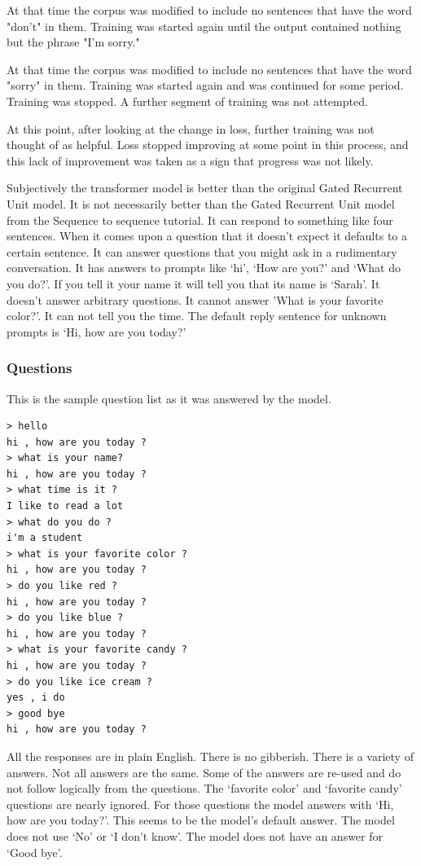 At that time the corpus was modified to include no 
sentences that have the word "don't" in them. Training was started again until the output contained nothing but the phrase "I'm sorry." 

At that time the corpus was modified to include no sentences that have the word "sorry" in them. Training was started again and was continued for some period. Training was stopped. A further segment of training was not attempted. 

At this point, after looking at the change in loss, further training was not thought of as helpful. Loss stopped improving at some point in this process, and this lack of improvement was taken as a sign that progress was not likely.

Subjectively the transformer model is better than the original Gated Recurrent Unit model. It is not necessarily better than the Gated Recurrent Unit model from the Sequence to sequence tutorial. It can respond to something like four sentences. When it comes upon a question that it doesn't expect it defaults to a certain sentence. It can answer questions that you might ask in a rudimentary conversation. It has answers to prompts like `hi', `How are you?' and `What do you do?'. If you tell it your name it will tell you that its name is `Sarah'. It doesn't answer arbitrary questions. It cannot answer 'What is your favorite color?'. It can not tell you the time. The default reply sentence for unknown prompts is `Hi, how are you today?'


\subsubsection*{Questions}
This is the sample question list as it was answered by the model.

\begin{verbatim}
> hello
hi , how are you today ?
> what is your name?
hi , how are you today ?
> what time is it ?
I like to read a lot
> what do you do ?
i'm a student
> what is your favorite color ?
hi , how are you today ?
> do you like red ?
hi , how are you today ?
> do you like blue ?
hi , how are you today ?
> what is your favorite candy ?
hi , how are you today ?
> do you like ice cream ?
yes , i do 
> good bye
hi , how are you today ?
\end{verbatim}

All the responses are in plain English. There is no gibberish. There is a variety of answers. Not all answers are the same. Some of the answers are re-used and do not follow logically from the questions. The `favorite color' and `favorite candy' questions are nearly ignored. For those questions the model answers with `Hi, how are you today?'. This seems to be the model's default answer. The model does not use `No' or `I don't know'. The model does not have an answer for `Good bye'.

